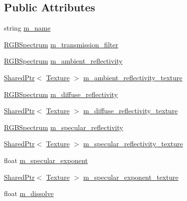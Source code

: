 \subsection*{Public Attributes}
\begin{DoxyCompactItemize}
\item 
string \hyperlink{structmage_1_1_material_a2b3e839a8ae093d53b12529d61ec6605}{m\+\_\+name}
\item 
\hyperlink{structmage_1_1_r_g_b_spectrum}{R\+G\+B\+Spectrum} \hyperlink{structmage_1_1_material_a9573a0d2a5fb0322f9eb103ace34dd47}{m\+\_\+transmission\+\_\+filter}
\item 
\hyperlink{structmage_1_1_r_g_b_spectrum}{R\+G\+B\+Spectrum} \hyperlink{structmage_1_1_material_ad8fb842410fe751ad220185271a00448}{m\+\_\+ambient\+\_\+reflectivity}
\item 
\hyperlink{namespacemage_a1e01ae66713838a7a67d30e44c67703e}{Shared\+Ptr}$<$ \hyperlink{classmage_1_1_texture}{Texture} $>$ \hyperlink{structmage_1_1_material_a72a90b9d339d705b5fd46098df5892e2}{m\+\_\+ambient\+\_\+reflectivity\+\_\+texture}
\item 
\hyperlink{structmage_1_1_r_g_b_spectrum}{R\+G\+B\+Spectrum} \hyperlink{structmage_1_1_material_afd2cc813023698e52edc01b267a17e6c}{m\+\_\+diffuse\+\_\+reflectivity}
\item 
\hyperlink{namespacemage_a1e01ae66713838a7a67d30e44c67703e}{Shared\+Ptr}$<$ \hyperlink{classmage_1_1_texture}{Texture} $>$ \hyperlink{structmage_1_1_material_a5193e30d3875695c96526a85edc84b88}{m\+\_\+diffuse\+\_\+reflectivity\+\_\+texture}
\item 
\hyperlink{structmage_1_1_r_g_b_spectrum}{R\+G\+B\+Spectrum} \hyperlink{structmage_1_1_material_a45587388f4ff57c209de2280b71af9d3}{m\+\_\+specular\+\_\+reflectivity}
\item 
\hyperlink{namespacemage_a1e01ae66713838a7a67d30e44c67703e}{Shared\+Ptr}$<$ \hyperlink{classmage_1_1_texture}{Texture} $>$ \hyperlink{structmage_1_1_material_ac925df9d71f8668c03e8efada632b300}{m\+\_\+specular\+\_\+reflectivity\+\_\+texture}
\item 
float \hyperlink{structmage_1_1_material_a62a9e8d9f90bf569b9f692c28da6a7dc}{m\+\_\+specular\+\_\+exponent}
\item 
\hyperlink{namespacemage_a1e01ae66713838a7a67d30e44c67703e}{Shared\+Ptr}$<$ \hyperlink{classmage_1_1_texture}{Texture} $>$ \hyperlink{structmage_1_1_material_a452a92691f612bd21857525c00c5e8e5}{m\+\_\+specular\+\_\+exponent\+\_\+texture}
\item 
float \hyperlink{structmage_1_1_material_a42b435ea58ce7da4b48febe9bb33aba7}{m\+\_\+dissolve}

\end{DoxyCompactItemize}
